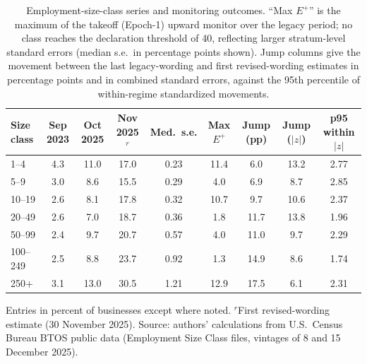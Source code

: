 \documentclass[review,authoryear,12pt]{elsarticle}
\begin{document}
\begin{table}[t]
\centering
\caption{Employment-size-class series and monitoring outcomes. ``Max $E^{+}$'' is the maximum of the takeoff (Epoch-1) upward monitor over the legacy period; no class reaches the declaration threshold of 40, reflecting larger stratum-level standard errors (median s.e.\ in percentage points shown). Jump columns give the movement between the last legacy-wording and first revised-wording estimates in percentage points and in combined standard errors, against the 95th percentile of within-regime standardized movements.}
\label{tab:strata}
\small
\begin{tabular}{lcccccccc}
\toprule
Size class & Sep 2023 & Oct 2025 & Nov 2025$^{r}$ & Med.\ s.e. & Max $E^{+}$ & Jump (pp) & Jump ($|z|$) & p95 within $|z|$ \\
\midrule
1--4       & 4.3 & 11.0 & 17.0 & 0.23 & 11.4 & 6.0  & 13.2 & 2.77 \\
5--9       & 3.0 &  8.6 & 15.5 & 0.29 &  4.0 & 6.9  &  8.7 & 2.85 \\
10--19     & 2.6 &  8.1 & 17.8 & 0.32 & 10.7 & 9.7  & 10.6 & 2.37 \\
20--49     & 2.6 &  7.0 & 18.7 & 0.36 &  1.8 & 11.7 & 13.8 & 1.96 \\
50--99     & 2.4 &  9.7 & 20.7 & 0.57 &  4.0 & 11.0 &  9.7 & 2.29 \\
100--249   & 2.5 &  8.8 & 23.7 & 0.92 &  1.3 & 14.9 &  8.6 & 1.74 \\
250+       & 3.1 & 13.0 & 30.5 & 1.21 & 12.9 & 17.5 &  6.1 & 2.31 \\
\bottomrule
\end{tabular}
\begin{minipage}{0.94\textwidth}
\vspace{2pt}
{\footnotesize Entries in percent of businesses except where noted. $^{r}$First revised-wording estimate (30 November 2025). Source: authors' calculations from U.S.\ Census Bureau BTOS public data (Employment Size Class files, vintages of 8 and 15 December 2025).}
\end{minipage}
\end{table}
\end{document}
